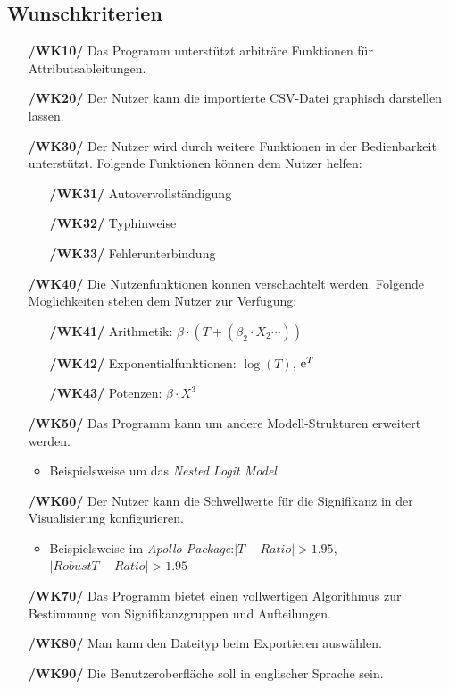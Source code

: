 \documentclass{article}
\begin{document}
\subsection{Wunschkriterien}
\begin{itemize}
    \item[\textbf{/WK10/}] Das Programm unterstützt arbiträre Funktionen für Attributsableitungen.
    \item[\textbf{/WK20/}] Der Nutzer kann die importierte CSV-Datei graphisch darstellen lassen.
    \item[\textbf{/WK30/}] Der Nutzer wird durch weitere Funktionen in der Bedienbarkeit unterstützt. \newline Folgende Funktionen können dem Nutzer helfen:
    \begin{itemize}[leftmargin=.7in]
        \item[\textbf{/WK31/}] Autovervollständigung
        \item[\textbf{/WK32/}] Typhinweise
        \item[\textbf{/WK33/}] Fehlerunterbindung
    \end{itemize}
    \item[\textbf{/WK40/}] Die Nutzenfunktionen können verschachtelt werden.
    \newline Folgende Möglichkeiten stehen dem Nutzer zur Verfügung:
    \begin{itemize}[leftmargin=.7in]
        \item[\textbf{/WK41/}] Arithmetik: $\beta \cdot (T + (\beta_2 \cdot X_2 \cdots))$
        \item[\textbf{/WK42/}] Exponentialfunktionen: $\log(T)$, ${\rm e}^T$
        \item[\textbf{/WK43/}] Potenzen: $\beta \cdot X^3$
    \end{itemize}
    \item[\textbf{/WK50/}] Das Programm kann um andere Modell-Strukturen erweitert werden.
    \begin{itemize}
        \item Beispielsweise um das \textit{Nested Logit Model}
    \end{itemize}
    \item[\textbf{/WK60/}] Der Nutzer kann die Schwellwerte für die Signifikanz in der Visualisierung konfigurieren.
    \begin{itemize}
        \item Beispielsweise im \textit{Apollo Package}:\newline $|T-Ratio | > 1.95$, $|Robust T-Ratio | > 1.95$
    \end{itemize}    
    \item[\textbf{/WK70/}] Das Programm bietet einen vollwertigen Algorithmus zur Bestimmung von Signifikanzgruppen und Aufteilungen.
    \item[\textbf{/WK80/}] Man kann den Dateityp beim Exportieren auswählen. 
    \item[\textbf{/WK90/}] Die Benutzeroberfläche soll in englischer Sprache sein.
\end{itemize}
\end{document}
